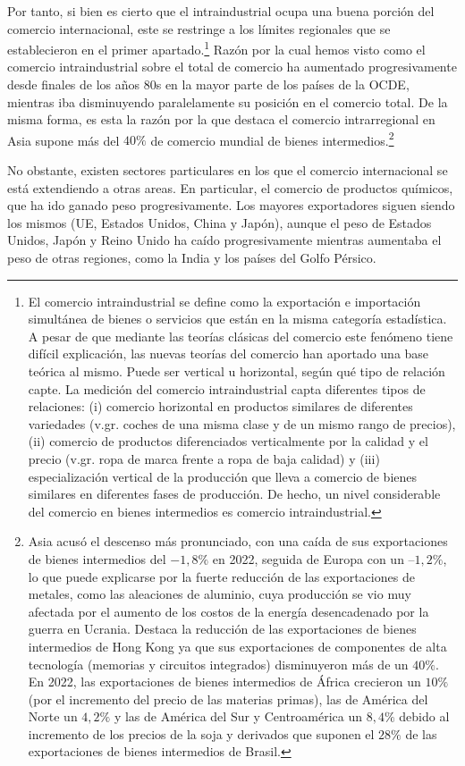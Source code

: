 \documentclass[10pt,a4paper]{article}
\begin{document}
Por tanto, si bien es cierto que el intraindustrial ocupa una buena porción del comercio internacional, este se restringe a los límites regionales que se establecieron en el primer apartado.\footnote{%
    El comercio intraindustrial se define como la exportación e importación simultánea de bienes o servicios que están en la misma categoría estadística. A pesar de que mediante las teorías clásicas del comercio este fenómeno tiene difícil explicación, las nuevas teorías del comercio han aportado una base teórica al mismo. Puede ser vertical u horizontal, según qué tipo de relación capte. La medición del comercio intraindustrial capta diferentes tipos de relaciones: (i) comercio horizontal en productos similares de diferentes variedades (v.gr. coches de una misma clase y de un mismo rango de precios), (ii) comercio de productos diferenciados verticalmente por la calidad y el precio (v.gr. ropa de marca frente a ropa de baja calidad) y (iii) especialización vertical de la producción que lleva a comercio de bienes similares en diferentes fases de producción. De hecho, un nivel considerable del comercio en bienes intermedios es comercio intraindustrial.
} Razón por la cual hemos visto como el comercio intraindustrial sobre el total de comercio ha aumentado progresivamente desde finales de los años 80s en la mayor parte de los países de la OCDE, mientras iba disminuyendo paralelamente su posición en el comercio total. De la misma forma, es esta la razón por la que destaca el comercio intrarregional en Asia supone más del $40\%$ de comercio mundial de bienes intermedios.\footnote{%
    Asia acusó el descenso más pronunciado, con una caída de sus exportaciones de bienes intermedios del $-1,8\%$ en 2022, seguida de Europa con un $–1,2\%$, lo que puede explicarse por la fuerte reducción de las exportaciones de metales, como las aleaciones de aluminio, cuya producción se vio muy afectada por el aumento de los costos de la energía desencadenado por la guerra en Ucrania. Destaca la reducción de las exportaciones de bienes intermedios de Hong Kong ya que sus exportaciones de componentes de alta tecnología (memorias y circuitos integrados) disminuyeron más de un $40\%$. En 2022, las exportaciones de bienes intermedios de África crecieron un $10\%$ (por el incremento del precio de las materias primas), las de América del Norte un $4,2\%$ y las de América del Sur y Centroamérica un $8,4\%$ debido al incremento de los precios de la soja y derivados que suponen el $28\%$ de las exportaciones de bienes intermedios de Brasil.
}

No obstante, existen sectores particulares en los que el comercio internacional se está extendiendo a otras areas. En particular, el comercio de productos químicos, que ha ido ganado peso progresivamente. Los mayores exportadores siguen siendo los mismos (UE, Estados Unidos, China y Japón), aunque el peso de Estados Unidos, Japón y Reino Unido ha caído progresivamente mientras aumentaba el peso de otras regiones, como la India y los países del Golfo Pérsico.
\end{document}
